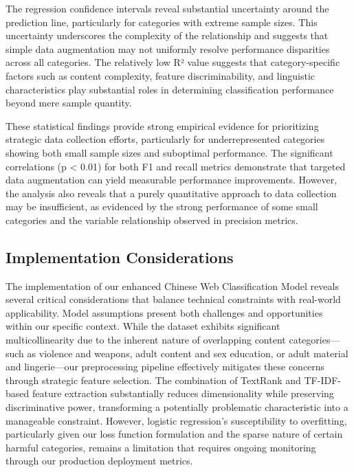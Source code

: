 \documentclass[
  titlepage]{article}
\begin{document}
The regression confidence intervals reveal substantial uncertainty
around the prediction line, particularly for categories with extreme
sample sizes. This uncertainty underscores the complexity of the
relationship and suggests that simple data augmentation may not
uniformly resolve performance disparities across all categories. The
relatively low R² value suggests that category-specific factors such as
content complexity, feature discriminability, and linguistic
characteristics play substantial roles in determining classification
performance beyond mere sample quantity.

These statistical findings provide strong empirical evidence for
prioritizing strategic data collection efforts, particularly for
underrepresented categories showing both small sample sizes and
suboptimal performance. The significant correlations (p \textless{}
0.01) for both F1 and recall metrics demonstrate that targeted data
augmentation can yield measurable performance improvements. However, the
analysis also reveals that a purely quantitative approach to data
collection may be insufficient, as evidenced by the strong performance
of some small categories and the variable relationship observed in
precision metrics.

\subsection{Implementation
Considerations}\label{implementation-considerations}

The implementation of our enhanced Chinese Web Classification Model
reveals several critical considerations that balance technical
constraints with real-world applicability. Model assumptions present
both challenges and opportunities within our specific context. While the
dataset exhibits significant multicollinearity due to the inherent
nature of overlapping content categories---such as violence and weapons,
adult content and sex education, or adult material and lingerie---our
preprocessing pipeline effectively mitigates these concerns through
strategic feature selection. The combination of TextRank and
TF-IDF-based feature extraction substantially reduces dimensionality
while preserving discriminative power, transforming a potentially
problematic characteristic into a manageable constraint. However,
logistic regression's susceptibility to overfitting, particularly given
our loss function formulation and the sparse nature of certain harmful
categories, remains a limitation that requires ongoing monitoring
through our production deployment metrics.
\end{document}
